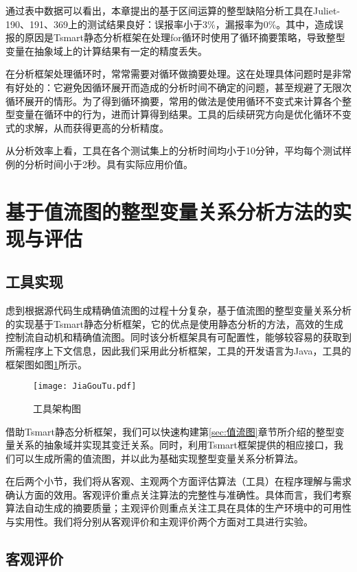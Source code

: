 通过表中数据可以看出，本章提出的基于区间运算的整型缺陷分析工具在Juliet-190、191、369上的测试结果良好：误报率小于3\%，漏报率为0\%。其中，造成误报的原因是Tsmart静态分析框架在处理for循环时使用了循环摘要策略，导致整型变量在抽象域上的计算结果有一定的精度丢失。

在分析框架处理循环时，常常需要对循环做摘要处理。这在处理具体问题时是非常有好处的：它避免因循环展开而造成的分析时间不确定的问题，甚至规避了无限次循环展开的情形。为了得到循环摘要，常用的做法是使用循环不变式来计算各个整型变量在循环中的行为，进而计算得到结果。工具的后续研究方向是优化循环不变式的求解，从而获得更高的分析精度。

从分析效率上看，工具在各个测试集上的分析时间均小于10分钟，平均每个测试样例的分析时间小于2秒。具有实际应用价值。

\section{基于值流图的整型变量关系分析方法的实现与评估}
\label{sec:值流图评估与结果}

\subsection{工具实现}

虑到根据源代码生成精确值流图的过程十分复杂，基于值流图的整型变量关系分析的实现基于Tsmart静态分析框架，它的优点是使用静态分析的方法，高效的生成控制流自动机和精确值流图。同时该分析框架具有可配置性，能够较容易的获取到所需程序上下文信息，因此我们采用此分析框架，工具的开发语言为Java，工具的框架图如图\ref{fig:架构图}所示。

\begin{figure}[H]
	\centering
	\texttt{[image: JiaGouTu.pdf]}
	\caption{工具架构图}
	\label{fig:架构图}
\end{figure}

借助Tsmart静态分析框架，我们可以快速构建第\ref{sec:值流图}章节所介绍的整型变量关系的抽象域并实现其变迁关系。同时，利用Tsmart框架提供的相应接口，我们可以生成所需的值流图，并以此为基础实现整型变量关系分析算法。

在后两个小节，我们将从客观、主观两个方面评估算法（工具）在程序理解与需求确认方面的效用。客观评价重点关注算法的完整性与准确性。具体而言，我们考察算法自动生成的摘要质量；主观评价则重点关注工具在具体的生产环境中的可用性与实用性。我们将分别从客观评价和主观评价两个方面对工具进行实验。

\subsection{客观评价}

